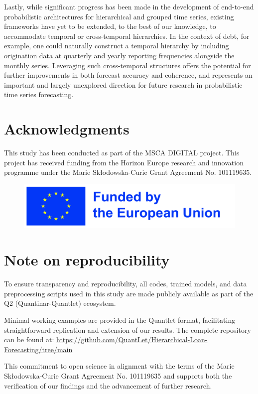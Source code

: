 \documentclass[letterpaper]{article}
\begin{document}
Lastly, while significant progress has been made in the development of end-to-end probabilistic architectures for hierarchical and grouped time series, 
existing frameworks have yet to be extended, to the best of our knowledge, to accommodate temporal or cross-temporal hierarchies. 
In the context of debt, for example, one could naturally construct a temporal hierarchy by including origination data at quarterly and yearly reporting frequencies alongside the monthly series. 
Leveraging such cross-temporal structures offers the potential for further improvements in both forecast accuracy and coherence, and represents an important and largely unexplored direction for future research in probabilistic time series forecasting.

\section{Acknowledgments}

This study has been conducted as part of the MSCA DIGITAL project.
This project has received funding from the Horizon Europe research and innovation programme under the Marie Skłodowska-Curie Grant Agreement No. 101119635.

\begin{figure}[h]
    \centering
    \includegraphics[width=\linewidth]{EU_fund.jpg}
\end{figure}

\section{Note on reproducibility}

To ensure transparency and reproducibility, all codes, trained models, 
and data preprocessing scripts used in this study are made publicly available as part of the Q2 (Quantinar-Quantlet) ecosystem.

Minimal working examples are provided in the Quantlet format, 
facilitating straightforward replication and extension of our results. 
The complete repository can be found at: \url{https://github.com/QuantLet/Hierarchical-Loan-Forecasting/tree/main}

This commitment to open science in alignment with the terms of the Marie Skłodowska-Curie Grant Agreement No. 101119635 and supports both the verification of our findings and the advancement of further research.
\end{document}
